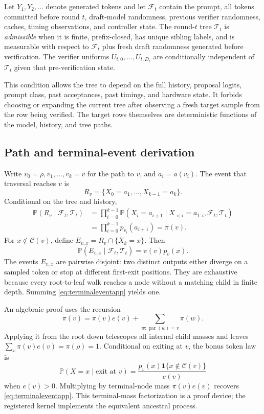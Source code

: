 \documentclass{article}
\newcommand{\T}{\mathcal{T}}
\newcommand{\C}{\mathcal{C}}
\newcommand{\Prb}{\mathbb{P}}
\newcommand{\parn}{\operatorname{par}}
\begin{document}
Let $Y_1,Y_2,\ldots$ denote generated tokens and let $\mathcal{F}_t$ contain the prompt, all tokens committed before round $t$, draft-model randomness, previous verifier randomness, caches, timing observations, and controller state.  The round-$t$ tree $\T_t$ is \emph{admissible} when it is finite, prefix-closed, has unique sibling labels, and is measurable with respect to $\mathcal{F}_t$ plus fresh draft randomness generated before verification.  The verifier uniforms $U_{t,0},\ldots,U_{t,D_t}$ are conditionally independent of $\T_t$ given that pre-verification state.

This condition allows the tree to depend on the full history, proposal logits, prompt class, past acceptances, past timings, and hardware state.  It forbids choosing or expanding the current tree after observing a fresh target sample from the row being verified.  The target rows themselves are deterministic functions of the model, history, and tree paths.

\subsection{Path and terminal-event derivation}

Write $v_0=\rho,v_1,\ldots,v_k=v$ for the path to $v$, and $a_i=a(v_i)$.  The event that traversal reaches $v$ is
\begin{equation}
R_v=\{X_0=a_1,\ldots,X_{k-1}=a_k\}.
\end{equation}
Conditional on the tree and history,
\begin{align}
\Prb(R_v\mid\mathcal F_t,\T_t)
&=\prod_{i=0}^{k-1}\Prb(X_i=a_{i+1}\mid X_{<i}=a_{1:i},\mathcal F_t,\T_t)\\
&=\prod_{i=0}^{k-1}p_{v_i}(a_{i+1})=\pi(v).
\end{align}
For $x\notin\C(v)$, define $E_{v,x}=R_v\cap\{X_k=x\}$.  Then
\begin{equation}
\Prb(E_{v,x}\mid\mathcal F_t,\T_t)=\pi(v)p_v(x).
\label{eq:terminaleventapp}
\end{equation}
The events $E_{v,x}$ are pairwise disjoint: two distinct outputs either diverge on a sampled token or stop at different first-exit positions.  They are exhaustive because every root-to-leaf walk reaches a node without a matching child in finite depth.  Summing \eqref{eq:terminaleventapp} yields one.

An algebraic proof uses the recursion
\begin{equation}
\pi(v)=\pi(v)e(v)+\sum_{w:\parn(w)=v}\pi(w).
\end{equation}
Applying it from the root down telescopes all internal child masses and leaves $\sum_v\pi(v)e(v)=\pi(\rho)=1$.  Conditional on exiting at $v$, the bonus token law is
\begin{equation}
\Prb(X=x\mid\text{exit at }v)=\frac{p_v(x)\mathbf 1\{x\notin\C(v)\}}{e(v)}
\end{equation}
when $e(v)>0$.  Multiplying by terminal-node mass $\pi(v)e(v)$ recovers \eqref{eq:terminaleventapp}.  This terminal-mass factorization is a proof device; the registered kernel implements the equivalent ancestral process.
\end{document}
